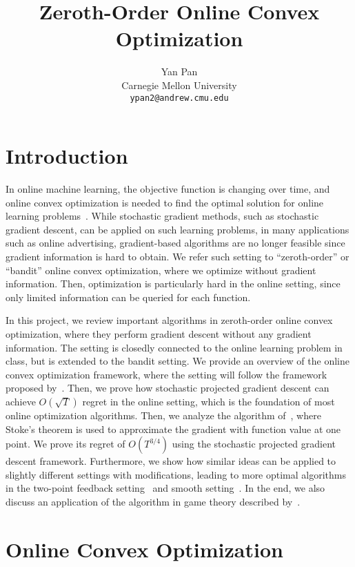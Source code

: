 \documentclass[11pt]{article}
\title{Zeroth-Order Online Convex Optimization}
\author{Yan Pan\\Carnegie Mellon University\\\texttt{ypan2@andrew.cmu.edu}}
\date{}
\begin{document}
\maketitle
\setlength{\baselineskip}{16pt}


\section{Introduction}
In online machine learning, the objective function is changing over time, and online convex optimization is needed to find the optimal solution for online learning problems~\citep{shalev2012online}.
While stochastic gradient methods, such as stochastic gradient descent, can be applied on such learning problems, in many applications such as online advertising, gradient-based algorithms are no longer feasible since gradient information is hard to obtain.
We refer such setting to ``zeroth-order'' or ``bandit'' online convex optimization, where we optimize without gradient information.
Then, optimization is particularly hard in the online setting, since only limited information can be queried for each function.

In this project, we review important algorithms in zeroth-order online convex optimization, where they perform gradient descent without any gradient information.
The setting is closedly connected to the online learning problem in class, but is extended to the bandit setting.
We provide an overview of the online convex optimization framework, where the setting will follow the framework proposed by~\cite{zinkevich2003online}.
Then, we prove how stochastic projected gradient descent can achieve $O(\sqrt{T})$ regret in the online setting, which is the foundation of most online optimization algorithms.
Then, we analyze the algorithm of~\cite{flaxman2005online}, where Stoke's theorem is used to approximate the gradient with function value at one point.
We prove its regret of $O(T^{3/4})$ using the stochastic projected gradient descent framework.
Furthermore, we show how similar ideas can be applied to slightly different settings with modifications, leading to more optimal algorithms in the two-point feedback setting~\citep{agarwal2010optimal} and smooth setting~\citep{saha2011improved}.
In the end, we also discuss an application of the algorithm in game theory described by~\cite{bravo2018bandit}.

\section{Online Convex Optimization}
\end{document}
